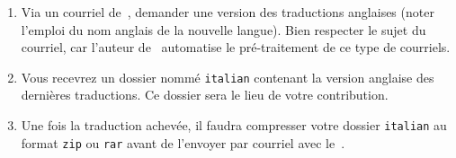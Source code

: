 \documentclass{tutodoc}
\begin{document}
\begin{enumerate}
    \item Via un courriel de \,, demander une version des traductions anglaises (noter l'emploi du nom anglais de la nouvelle langue).
    Bien respecter le sujet du courriel, car l'auteur de \thisproj\ automatise le pré-traitement de ce type de courriels.

    \item Vous recevrez un dossier nommé \verb#italian# contenant la version anglaise des dernières traductions.
    Ce dossier sera le lieu de votre contribution.

    \item Une fois la traduction achevée, il faudra compresser votre dossier \verb#italian# au format \verb#zip# ou \verb#rar# avant de l'envoyer par courriel avec le \,.
\end{enumerate}
\end{document}
